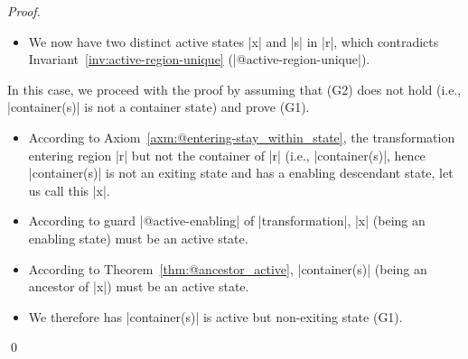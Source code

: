 \begin{proof}
\begin{case}
\begin{itemize}
\begin{itemize}
\begin{itemize}
            \item We now have two distinct active states |x| and |s| in |r|, which contradicts Invariant~\ref{inv:active-region-unique} (|@active-region-unique|).
        \end{itemize}
    \end{itemize}
\end{itemize}
\end{case}

\begin{case}
\label{container_active:case2}
In this case, we proceed with the proof by assuming that (G2) does not hold (i.e., |container(s)| is not a container state) and prove (G1).  
\begin{itemize}
    \item According to Axiom~\ref{axm:@entering-stay_within_state}, the transformation entering region |r| but not the container of |r| (i.e., |container(s)|, hence |container(s)| is not an exiting state and has a enabling descendant state, let us call this |x|.

    \item According to guard |@active-enabling| of |transformation|, |x| (being an enabling state) must be an active state.
    
    \item According to Theorem~\ref{thm:@ancestor_active}, |container(s)| (being an ancestor of |x|) must be an active state. 

    \item We therefore has |container(s)| is active but non-exiting state (G1).    
\end{itemize}
\end{case}
\qed
\end{proof}
        




